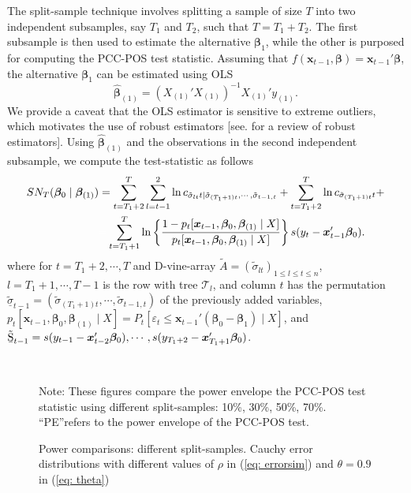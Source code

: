 \documentclass[harvard,11pt]{article}
\begin{document}
The split-sample technique involves splitting a sample of size $T$ into two independent subsamples, say $T_1$ and $T_2$, such that $T=T_1+T_2$. The first subsample is then used to estimate the alternative $\bm{\beta}_1$, while the other is purposed for computing the PCC-POS test statistic. Assuming that $f(\bm{x}_{t-1},\bm{\beta})=\bm{x}_{t-1}'\bm{\beta}$, the alternative $\bm{\beta}_1$ can be estimated using OLS
\[
\hat{\bm{\beta}}_{(1)}=(X_{(1)}'X_{(1)})^{-1}X_{(1)}'y_{(1)}.
\]
We provide a caveat that the OLS estimator is sensitive to extreme outliers, which motivates the use of robust estimators [see. \citet{maronna2019robust} for a review of robust estimators]. Using $\hat{\bm{\beta}}_{(1)}$ and the observations in the second independent subsample, we compute the test-statistic as follows
\begingroup
\allowdisplaybreaks
\begin{align*}
SN_{T}(\bm{\beta}_0\mid\bm{\beta}_{(1)})&=\sum\limits_{t=T_1+2}^{T}\sum\limits_{l=t-1}^{2}\ln c_{\tilde{\sigma}_{lt}t\mid \tilde{\sigma}_{(T_1+1)t},\cdots,\tilde{\sigma}_{t-1,t}}+\sum\limits_{t=T_1+2}^{T}\ln c_{\tilde{\sigma}_{(T_1+1)t}t}+\\
&\textcolor{white}{=}\sum\limits_{t=T_1+1}^{T}\ln\left\{\frac{1-p_t[\bm{x}_{t-1},\bm{\beta}_0,\bm{\beta}_{(1)}\mid X]}{p_t[\bm{x}_{t-1},\bm{\beta}_0,\bm{\beta}_{(1)}\mid X]}\right\}s(y_t-\bm{x}_{t-1}'\bm{\beta}_0).
\end{align*}
\endgroup
where for $t=T_1+2,\cdots,T$ and D-vine-array $\tilde{A}=(\tilde{\sigma}_{lt})_{1\leq l\leq t\leq n}$, $l=T_1+1,\cdots,T-1$ is the row with tree $\mathcal{T}_l$, and column $t$ has the permutation $\tilde{\underline{\sigma}}_{t-1}=(\tilde{\sigma}_{(T_1+1)t},\cdots,\tilde{\sigma}_{t-1,t})$ of the previously added variables, $p_t[\bm{x}_{t-1},\bm{\beta}_0,\bm{\beta}_{(1)}\mid X]=P_t[\varepsilon_t\leq \bm{x}_{t-1}'(\bm{\beta}_0-\bm{\beta}_1)\mid X]$, and $\tilde{\text{\b{S}}}_{t-1}=s(y_{t-1}-\bm{x}_{t-2}'\bm{\beta}_0),\cdots,s(y_{T_1+2}-\bm{x}_{T_1+1}'\bm{\beta}_0)$.
\begin{figure}[tbph]
\caption{Power comparisons: different split-samples. Cauchy error distributions with
different values of $\rho $ in (\ref{eq: errorsim}) and $\theta =0.9$ in (\ref{eq: theta})}
\begin{center}
 \\[0pt]
\end{center}
\doublespacing
Note: These figures compare the power
envelope the PCC-POS test statistic using different split-samples: 10\%, 30\%, 50\%, 70\%. \textquotedblleft PE\textquotedblright refers to the power envelope of the PCC-POS test.
\label{fig: SS28}
\end{figure}
\end{document}
